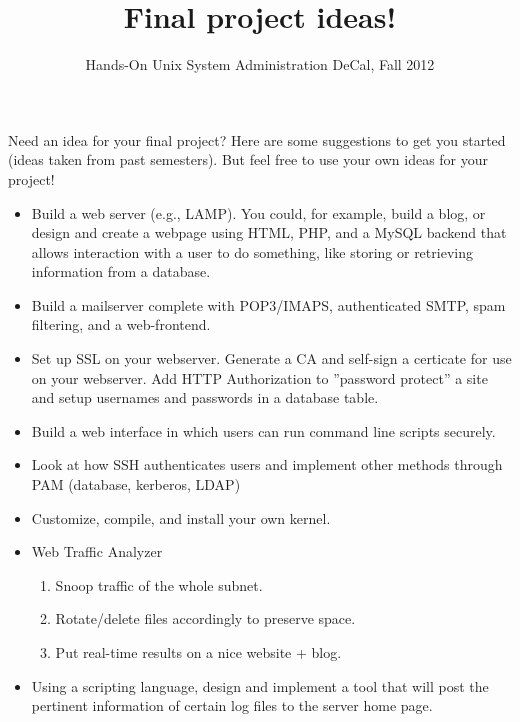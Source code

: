 \documentclass{article}
\begin{document}
\title{Final project ideas!}
\author{Hands-On {\sc Unix} System Administration DeCal, Fall 2012}
\date{}
\maketitle
\thispagestyle{empty}

Need an idea for your final project? Here are some suggestions to get you started (ideas taken from past semesters). But feel free to use your own ideas for your project!

\begin{itemize}
	\item Build a web server (e.g., LAMP). You could, for example, build a blog, or design and create a webpage using HTML, PHP, and a MySQL backend that allows interaction with a user to do something, like storing or retrieving information from a database.
	\item Build a mailserver complete with POP3/IMAPS, authenticated SMTP, spam filtering, and a web-frontend.
	\item Set up SSL on your webserver. Generate a CA and self-sign a certicate for use on your webserver. Add HTTP Authorization to ”password protect” a site and setup usernames and passwords in a database table.
	\item Build a web interface in which users can run command line scripts securely.
	
	\item Look at how SSH authenticates users and implement other methods through PAM (database, kerberos, LDAP)
	\item Customize, compile, and install your own kernel.  
	\item Web Traffic Analyzer 
		\begin{enumerate}
			\item Snoop traffic of the whole subnet.

			\item Rotate/delete files accordingly to preserve space.

			\item Put real-time results on a nice website + blog.
		\end{enumerate}
	\item Using a scripting language, design and implement a tool that will post the pertinent information of certain log files to the server home page.

\end{itemize}
\end{document}

